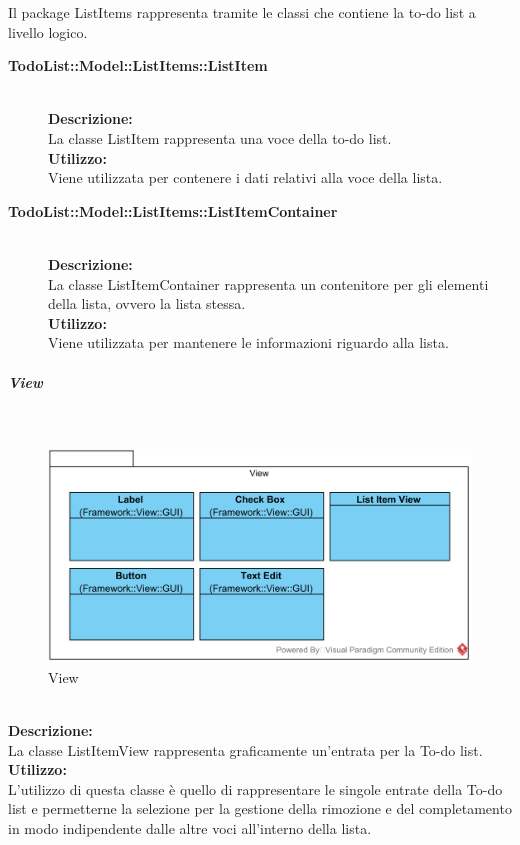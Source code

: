 Il package ListItems rappresenta tramite le classi che contiene la to-do list a livello logico.\\
\begin{description}
	\item[\textbf{TodoList\-::Model\-::ListItems::ListItem}] \hfill\\
	\textbf{Descrizione:}\\
	La classe ListItem rappresenta una voce della to-do list.\\
	\textbf{Utilizzo:}\\
	Viene utilizzata per contenere i dati relativi alla voce della lista.
	\item[\textbf{TodoList\-::Model\-::ListItems::ListItemContainer}] \hfill\\
	\textbf{Descrizione:}\\
	La classe ListItemContainer rappresenta un contenitore per gli elementi della lista, ovvero la lista stessa.\\
	\textbf{Utilizzo:}\\
	Viene utilizzata per mantenere le informazioni riguardo alla lista.
\end{description}


\subparagraph{View}\mbox{}\\
\nopagebreak
\begin{figure}[H]
	\centering
	\includegraphics[width=14cm]{../../documenti/SpecificaTecnica/diagrammi_img/classi_e_package/todo_view.png}
	\caption{View}
\end{figure}

\label{todo-view}\mbox{}\\
\textbf{Descrizione:}\\
La classe ListItemView rappresenta graficamente un'entrata per la To-do list.\\
\textbf{Utilizzo:}\\
L'utilizzo di questa classe è quello di rappresentare le singole entrate della To-do list e permetterne la selezione per la gestione della rimozione e del completamento in modo indipendente dalle altre voci all'interno della lista.\\


